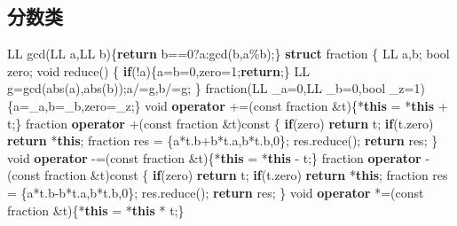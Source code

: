 \documentclass[
]{article}
\newenvironment{Shaded}{}{}
\newcommand{\AttributeTok}[1]{\textcolor[rgb]{0.49,0.56,0.16}{#1}}
\newcommand{\ControlFlowTok}[1]{\textcolor[rgb]{0.00,0.44,0.13}{\textbf{#1}}}
\newcommand{\DataTypeTok}[1]{\textcolor[rgb]{0.56,0.13,0.00}{#1}}
\newcommand{\DecValTok}[1]{\textcolor[rgb]{0.25,0.63,0.44}{#1}}
\newcommand{\KeywordTok}[1]{\textcolor[rgb]{0.00,0.44,0.13}{\textbf{#1}}}
\newcommand{\NormalTok}[1]{#1}
\begin{document}
\hypertarget{ux5206ux6570ux7c7b}{%
\subsection{分数类}\label{ux5206ux6570ux7c7b}}

\begin{Shaded}
\begin{Highlighting}[]
\NormalTok{LL gcd(LL a,LL b)\{}\ControlFlowTok{return}\NormalTok{ b==}\DecValTok{0}\NormalTok{?a:gcd(b,a\%b);\}}
\KeywordTok{struct}\NormalTok{ fraction}
\NormalTok{\{}
\NormalTok{    LL a,b; }\DataTypeTok{bool}\NormalTok{ zero;}
    \DataTypeTok{void}\NormalTok{ reduce()}
\NormalTok{    \{}
        \ControlFlowTok{if}\NormalTok{(!a)\{a=b=}\DecValTok{0}\NormalTok{,zero=}\DecValTok{1}\NormalTok{;}\ControlFlowTok{return}\NormalTok{;\}}
\NormalTok{        LL g=gcd(abs(a),abs(b));a/=g,b/=g;}
\NormalTok{    \}}
\NormalTok{    fraction(LL \_a=}\DecValTok{0}\NormalTok{,LL \_b=}\DecValTok{0}\NormalTok{,}\DataTypeTok{bool}\NormalTok{ \_z=}\DecValTok{1}\NormalTok{)\{a=\_a,b=\_b,zero=\_z;\}}
    \DataTypeTok{void} \KeywordTok{operator}\NormalTok{ +=(}\AttributeTok{const}\NormalTok{ fraction \&t)\{*}\KeywordTok{this}\NormalTok{ = *}\KeywordTok{this}\NormalTok{ + t;\} }
\NormalTok{    fraction }\KeywordTok{operator}\NormalTok{ +(}\AttributeTok{const}\NormalTok{ fraction \&t)}\AttributeTok{const} 
\NormalTok{    \{}
        \ControlFlowTok{if}\NormalTok{(zero)   }\ControlFlowTok{return}\NormalTok{ t; }
        \ControlFlowTok{if}\NormalTok{(t.zero) }\ControlFlowTok{return}\NormalTok{ *}\KeywordTok{this}\NormalTok{;}
\NormalTok{        fraction res = \{a*t.b+b*t.a,b*t.b,}\DecValTok{0}\NormalTok{\};}
\NormalTok{        res.reduce();}
        \ControlFlowTok{return}\NormalTok{ res;}
\NormalTok{    \}}
    \DataTypeTok{void} \KeywordTok{operator}\NormalTok{ {-}=(}\AttributeTok{const}\NormalTok{ fraction \&t)\{*}\KeywordTok{this}\NormalTok{ = *}\KeywordTok{this}\NormalTok{ {-} t;\} }
\NormalTok{    fraction }\KeywordTok{operator}\NormalTok{ {-}(}\AttributeTok{const}\NormalTok{ fraction \&t)}\AttributeTok{const} 
\NormalTok{    \{}
        \ControlFlowTok{if}\NormalTok{(zero)   }\ControlFlowTok{return}\NormalTok{ t; }
        \ControlFlowTok{if}\NormalTok{(t.zero) }\ControlFlowTok{return}\NormalTok{ *}\KeywordTok{this}\NormalTok{;}
\NormalTok{        fraction res = \{a*t.b{-}b*t.a,b*t.b,}\DecValTok{0}\NormalTok{\};}
\NormalTok{        res.reduce();}
        \ControlFlowTok{return}\NormalTok{ res;}
\NormalTok{    \}}
    \DataTypeTok{void} \KeywordTok{operator}\NormalTok{ *=(}\AttributeTok{const}\NormalTok{ fraction \&t)\{*}\KeywordTok{this}\NormalTok{ = *}\KeywordTok{this}\NormalTok{ * t;\} }

\end{Highlighting}
\end{Shaded}
\end{document}
